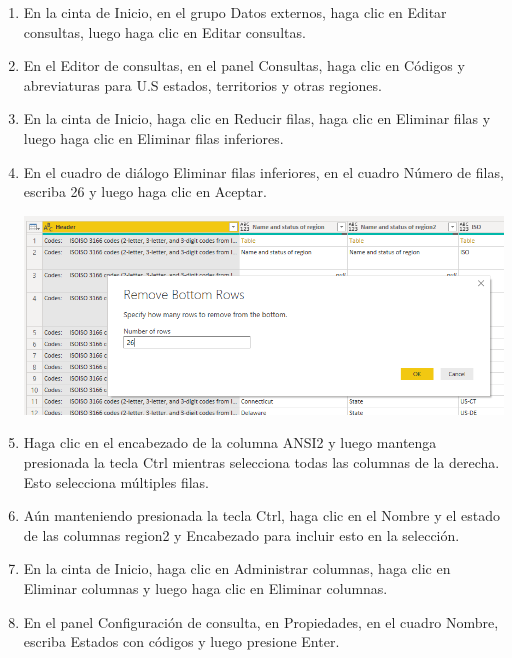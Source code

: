\documentclass[12pt,letterpaper]{article}
\begin{document}
\begin{enumerate}
    \item En la cinta de Inicio, en el grupo Datos externos, haga clic en Editar consultas, luego haga clic en Editar consultas.
    
    
    
    \item En el Editor de consultas, en el panel Consultas, haga clic en Códigos y abreviaturas para U.S estados, territorios y otras regiones.

     
    \item En la cinta de Inicio, haga clic en Reducir filas, haga clic en Eliminar filas y luego haga clic en Eliminar filas inferiores.
    
    \item En el cuadro de diálogo Eliminar filas inferiores, en el cuadro Número de filas, escriba 26 y luego haga clic en Aceptar.
    
        \begin{center}
	\includegraphics[width=13cm]{./Imagenes/9}
	\end{center}

    \item Haga clic en el encabezado de la columna ANSI2 y luego mantenga presionada la tecla Ctrl mientras selecciona todas las columnas de la derecha. Esto selecciona múltiples filas.
    
    \item Aún manteniendo presionada la tecla Ctrl, haga clic en el Nombre y el estado de las columnas region2 y Encabezado para incluir esto en la selección.

 
    \item En la cinta de Inicio, haga clic en Administrar columnas, haga clic en Eliminar columnas y luego haga clic en Eliminar columnas.
    
    \item En el panel Configuración de consulta, en Propiedades, en el cuadro Nombre, escriba Estados con códigos y luego presione Enter.


\end{enumerate}
\end{document}
